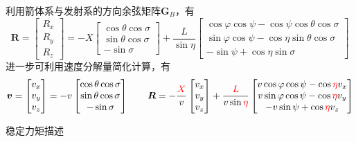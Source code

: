 利用箭体系与发射系的方向余弦矩阵$\bm{G}_B$，有
\begin{equation}
	\bm{R} = 
	\begin{bmatrix}
		R_x \\
		R_y\\
		R_z
	\end{bmatrix}
	= -X
	\begin{bmatrix}
		\cos \theta \cos \sigma \\
		\sin \theta \cos \sigma \\
		- \sin \sigma
	\end{bmatrix}
	+ \dfrac{L}{\sin \eta}
	\begin{bmatrix}
		\cos \varphi \cos \psi - \cos \psi \cos \theta \cos \sigma \\
		\sin \varphi \cos \psi - \cos \eta \sin \theta \cos \sigma\\
		- \sin \psi + \cos \eta \sin \sigma
	\end{bmatrix}
\end{equation}
进一步可利用速度分解量简化计算，有
\begin{equation}
	\bm{v} = 
	\begin{bmatrix}
		v_x \\
		v_y \\
		v_z
	\end{bmatrix}
	= 
	-v
	\begin{bmatrix}
		\cos \theta \cos \sigma \\
		\sin \theta \cos \sigma \\
		- \sin \sigma 
	\end{bmatrix}
	\qquad 
	\bm{R} = -\dfrac{\red[X]}{v}
	\begin{bmatrix}
		v_x \\
		v_y\\
		v_z
	\end{bmatrix}
	+ \dfrac{\red[L]}{v \sin \red[\eta]}
	\begin{bmatrix}
		v \cos \varphi \cos \psi - \cos \red[\eta] v_x \\
		v \sin \varphi \cos \psi - \cos \red[\eta] v_y \\
		- v \sin \psi + \cos \red[\eta] v_z 
	\end{bmatrix}
\end{equation}
\vspace*{0.5em}

\noa[6] 稳定力矩描述

